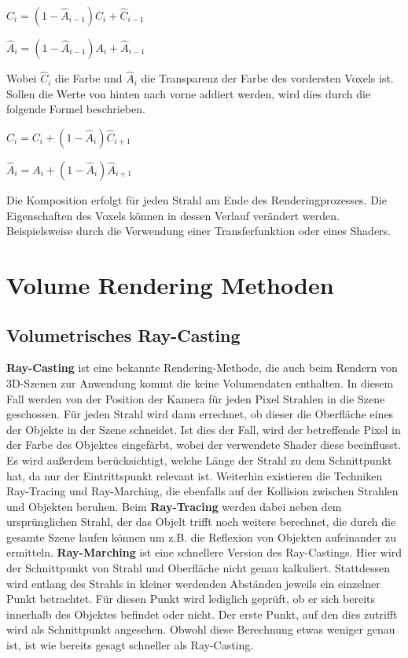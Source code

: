 $\hat{C}_{i}=(1-\hat{A}_{i-1})C_{i}+\hat{C}_{i-1}$

$\hat{A}_{i}=(1-\hat{A}_{i-1})A_{i}+\hat{A}_{i-1}$

Wobei $\hat{C}_{i}$ die Farbe und $\hat{A}_{i}$ die Transparenz der Farbe des vordersten Voxels ist.
Sollen die Werte von hinten nach vorne addiert werden, wird dies durch die folgende Formel beschrieben.

$\hat{C}_{i}=C_{i}+(1-\hat{A}_{i})\hat{C}_{i+1}$

$\hat{A}_{i}=A_{i}+(1-\hat{A}_{i})\hat{A}_{i+1}$

Die Komposition erfolgt für jeden Strahl am Ende des Renderingprozesses. Die Eigenschaften des Voxels können in dessen Verlauf verändert werden. Beispielsweise durch die Verwendung einer Transferfunktion oder eines Shaders.


\section{Volume Rendering Methoden}

\subsection{Volumetrisches Ray-Casting}
\label{rayCasting}

\textbf{Ray-Casting} ist eine bekannte Rendering-Methode, die auch beim Rendern von 3D-Szenen zur Anwendung kommt die keine Volumendaten enthalten.
In diesem Fall werden von der Position der Kamera für jeden Pixel Strahlen in die Szene geschossen. Für jeden Strahl wird dann errechnet, ob dieser die Oberfläche eines der Objekte in der Szene schneidet. Ist dies der Fall, wird der betreffende Pixel in der Farbe des Objektes eingefärbt, wobei der verwendete Shader diese beeinflusst. Es wird außerdem berücksichtigt, welche Länge der Strahl zu dem Schnittpunkt hat, da nur der Eintrittspunkt relevant ist.
Weiterhin existieren die Techniken Ray-Tracing und Ray-Marching, die ebenfalls auf der Kollision zwischen Strahlen und Objekten beruhen.
Beim \textbf{Ray-Tracing} werden dabei neben dem ursprünglichen Strahl, der das Objelt trifft noch weitere berechnet, die durch die gesamte Szene laufen können um z.B. die Reflexion von Objekten aufeinander zu ermitteln. 
\textbf{Ray-Marching} ist eine schnellere Version des Ray-Castings. Hier wird der Schnittpunkt von Strahl und Oberfläche nicht genau kalkuliert. Stattdessen wird entlang des Strahls in kleiner werdenden Abständen jeweils ein einzelner Punkt betrachtet. Für diesen Punkt wird lediglich geprüft, ob er sich bereits innerhalb des Objektes befindet oder nicht. Der erste Punkt, auf den dies zutrifft wird als Schnittpunkt angesehen. Obwohl diese Berechnung etwas weniger genau ist, ist wie bereits gesagt schneller als Ray-Casting.

